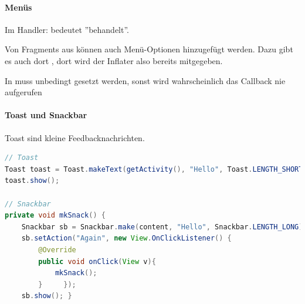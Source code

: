 \paragraph{Menüs}
Im Handler:  bedeutet ''behandelt''.

Von Fragments aus können auch Menü-Optionen hinzugefügt werden. Dazu gibt es auch dort , dort wird der Inflater also bereits mitgegeben.

In  muss unbedingt  gesetzt werden, sonst wird wahrscheinlich das Callback nie aufgerufen
\paragraph{Toast und Snackbar} Toast sind kleine Feedbacknachrichten. 
\begin{lstlisting}[language=java]
// Toast
Toast toast = Toast.makeText(getActivity(), "Hello", Toast.LENGTH_SHORT);
toast.show();

// Snackbar
private void mkSnack() {
    Snackbar sb = Snackbar.make(content, "Hello", Snackbar.LENGTH_LONG);
    sb.setAction("Again", new View.OnClickListener() {
        @Override
        public void onClick(View v){
            mkSnack();
        }     });
    sb.show(); }
\end{lstlisting}